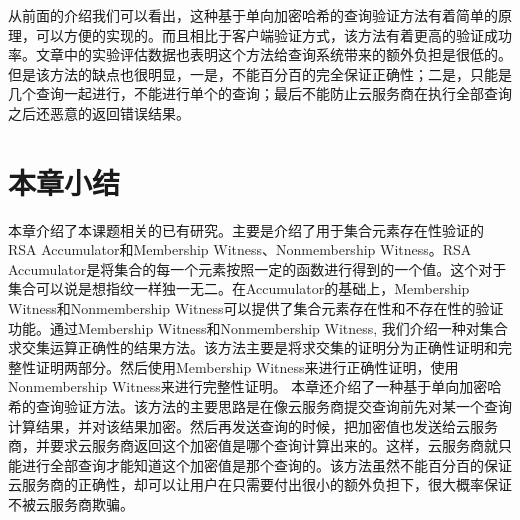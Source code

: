 从前面的介绍我们可以看出，这种基于单向加密哈希的查询验证方法有着简单的原理，可以方便的实现的。而且相比于客户端验证方式，该方法有着更高的验证成功率。文章\cite{sion2005query}中的实验评估数据也表明这个方法给查询系统带来的额外负担是很低的。但是该方法的缺点也很明显，一是，不能百分百的完全保证正确性；二是，只能是几个查询一起进行，不能进行单个的查询；最后不能防止云服务商在执行全部查询之后还恶意的返回错误结果。

\section{本章小结}
本章介绍了本课题相关的已有研究。主要是介绍了用于集合元素存在性验证的RSA Accumulator和Membership Witness、Nonmembership Witness。RSA Accumulator是将集合的每一个元素按照一定的函数进行得到的一个值。这个对于集合可以说是想指纹一样独一无二。在Accumulator的基础上，Membership Witness和Nonmembership Witness可以提供了集合元素存在性和不存在性的验证功能。通过Membership Witness和Nonmembership Witness, 我们介绍一种对集合求交集运算正确性的结果方法。该方法主要是将求交集的证明分为正确性证明和完整性证明两部分。然后使用Membership Witness来进行正确性证明，使用Nonmembership Witness来进行完整性证明。
本章还介绍了一种基于单向加密哈希的查询验证方法。该方法的主要思路是在像云服务商提交查询前先对某一个查询计算结果，并对该结果加密。然后再发送查询的时候，把加密值也发送给云服务商，并要求云服务商返回这个加密值是哪个查询计算出来的。这样，云服务商就只能进行全部查询才能知道这个加密值是那个查询的。该方法虽然不能百分百的保证云服务商的正确性，却可以让用户在只需要付出很小的额外负担下，很大概率保证不被云服务商欺骗。

